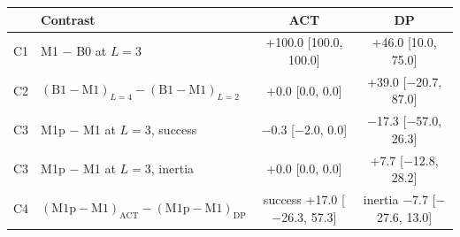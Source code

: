 \begin{tabular}{llcc}
\toprule
 & Contrast & ACT & DP \\
\midrule
C1 & M1 $-$ B0 at $L=3$ & +100.0 [100.0, 100.0] & +46.0 [10.0, 75.0] \\
C2 & $(\text{B1}-\text{M1})_{L=4} - (\text{B1}-\text{M1})_{L=2}$ & +0.0 [0.0, 0.0] & +39.0 [$-$20.7, 87.0] \\
C3 & M1p $-$ M1 at $L=3$, success & $-$0.3 [$-$2.0, 0.0] & $-$17.3 [$-$57.0, 26.3] \\
C3 & M1p $-$ M1 at $L=3$, inertia & +0.0 [0.0, 0.0] & +7.7 [$-$12.8, 28.2] \\
C4 & $(\text{M1p}-\text{M1})_{\text{ACT}} - (\text{M1p}-\text{M1})_{\text{DP}}$ & success +17.0 [$-$26.3, 57.3] & inertia $-$7.7 [$-$27.6, 13.0] \\
\bottomrule
\end{tabular}
